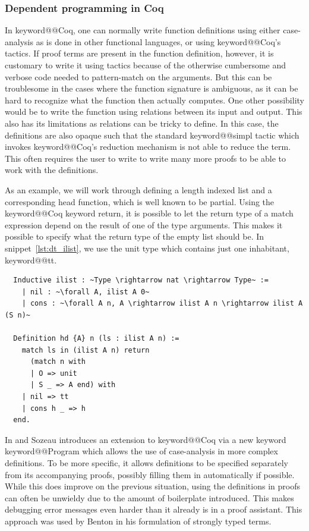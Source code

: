 \documentclass[12pt, final]{article}
\makeatletter
\def\<#1>{\csname keyword@@#1\endcsname}
\makeatother
\begin{document}
\subsubsection{Dependent programming in Coq}

In \<Coq>, one can normally write function definitions using either case-analysis as is done in other functional languages, or using \<Coq>'s tactics.
If proof terms are present in the function definition, however, it is customary to write it using tactics because of the otherwise cumbersome and verbose code needed to pattern-match on the arguments. But this can be troublesome in the cases where the function signature is ambiguous, as it can be hard to recognize what the function then actually computes.
One other possibility would be to write the function using relations between its input and output.
This also has its limitations as relations can be tricky to define. In this case, the definitions are also opaque such that the standard \<simpl> tactic which invokes \<Coq>'s reduction mechanism is not able to reduce the term.
This often requires the user to write to write many more proofs to be able to work with the definitions.

As an example, we will work through defining a length indexed list and a corresponding head function, which is well known to be partial.
Using the \<Coq> keyword return, it is possible to let the return type of a match expression depend on the result of one of the type arguments.
This makes it possible to specify what the return type of the empty list should be.
In snippet~\ref{lst:dt_ilist}, we use the unit type which contains just one inhabitant, \<tt>.

\begin{listing}
  \begin{verbatim}
  Inductive ilist : ~Type \rightarrow nat \rightarrow Type~ :=
    | nil : ~\forall A, ilist A 0~
    | cons : ~\forall A n, A \rightarrow ilist A n \rightarrow ilist A (S n)~

  Definition hd {A} n (ls : ilist A n) :=
    match ls in (ilist A n) return
      (match n with
      | O => unit
      | S _ => A end) with
    | nil => tt
    | cons h _ => h
  end.
  \end{verbatim}
  \caption{Definition of a length indexed list and hd using the return keyword, adapted from \cite{ChlipalaCPDT}.}
  \label{lst:dt_ilist}
\end{listing}

In \cite{Sozeau2006} and \cite{Sozeau2007} Sozeau introduces an extension to \<Coq> via a new keyword \<Program> which allows the use of case-analysis in more complex definitions.
To be more specific, it allows definitions to be specified separately from its accompanying proofs, possibly filling them in automatically if possible.
While this does improve on the previous situation, using the definitions in proofs can often be unwieldy due to the amount of boilerplate introduced.
This makes debugging error messages even harder than it already is in a proof assistant. This approach was used by Benton in his formulation of strongly typed terms.
\end{document}
